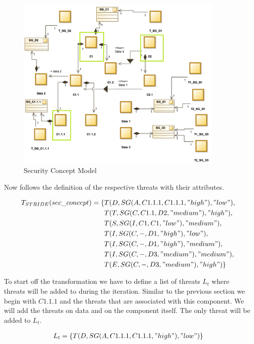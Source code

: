 \begin{figure}[H]
\centering
\includegraphics[width=0.9\textwidth]{pictures/threat_transformation}
\caption{Security Concept Model}
\label{fig:con_c2}
\end{figure}

Now follows the definition of the respective threats with their attributes. 

\begin{align*}
T_{STRIDE}(sec\_concept) = \{&T(D, SG(A,C1.1.1,C1.1.1,"high"), "low"), \\
&T(T, SG(C,C1.1,D2,"medium"), "high"), \\
&T(S, SG(I,C1,C1,"low"), "medium"), \\
&T(I, SG(C,-,D1,"high"), "low"), \\
&T(I, SG(C,-,D1,"high"), "medium"), \\
&T(I, SG(C,-,D3,"medium"), "medium"), \\
&T(E, SG(C,-,D3,"medium"), "high")
\} 
\end{align*}

To start off the transformation we have to define a list of threats $L_t$ where threats will be added to during the iteration. Similar to the previous section we begin with $C1.1.1$ and the threats that are associated with this component. We will add the threats on data and on the component itself. The only threat will be added to $L_t$.

\begin{align*}
L_t = \{T(D, SG(A,C1.1.1,C1.1.1,"high"), "low")\}
\end{align*}


